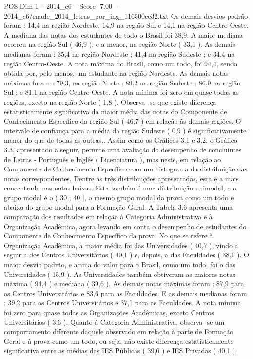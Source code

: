 \begin{textsample}{POS Dim 1 – 2014\_c6 – Score -7.00 – 2014\_c6/enade\_2014\_letras\_por\_ing\_116500ce32.txt}
Os demais desvios padrão foram : 14,4 na região Nordeste, 14,9 na região Sul e 14,1 na região Centro-Oeste.
A mediana das notas dos estudantes de todo o Brasil foi 38,9.
A maior mediana ocorreu na região Sul ( 46,9 ), e a menor, na região Norte ( 33,1 ).
As demais medianas foram : 35,4 na região Nordeste ; 41,4 na região Sudeste ; e 34,4 na região Centro-Oeste.
A nota máxima do Brasil, como um todo, foi 94,4, sendo obtida por, pelo menos, um estudante na região Nordeste.
As demais notas máximas foram : 79,3, na região Norte ; 89,2 na região Sudeste ; 86,9 na região Sul ; e 81,1 na região Centro-Oeste.
A nota mínima foi zero em quase todas as regiões, exceto na região Norte ( 1,8 ).
Observa -se que existe diferença estatisticamente significativa da maior média das notas do Componente de Conhecimento Específico da região Sul ( 46,7 ) em relação às demais regiões.
O intervalo de confiança para a média da região Sudeste ( 0,9 ) é significativamente menor do que de todas as outras..
Assim como os Gráficos 3.1 e 3.2, o Gráfico 3.3, apresentado a seguir, permite uma avaliação do desempenho de concluintes de Letras - Português e Inglês ( Licenciatura ), mas neste, em relação ao Componente de Conhecimento Específico com um histograma da distribuição das notas correspondentes.
Dentre as três distribuições apresentadas, esta é a mais concentrada nas notas baixas.
Esta também é uma distribuição unimodal, e o grupo modal é o ( 30 ; 40 ], o mesmo grupo modal da prova como um todo e abaixo do grupo modal para a Formação Geral.
A Tabela 3.6 apresenta uma comparação dos resultados em relação à Categoria Administrativa e à Organização Acadêmica, agora levando em conta o desempenho de estudantes do Componente de Conhecimento Específico da prova.
No que se refere à Organização Acadêmica, a maior média foi das Universidades ( 40,7 ), vindo a seguir a dos Centros Universitários ( 40,1 ) e, depois, a das Faculdades ( 38,0 ).
O maior desvio padrão, e acima do valor para o Brasil, como um todo, foi o das Universidades ( 15,9 ).
As Universidades também obtiveram as maiores notas máxima ( 94,4 ) e mediana ( 39,6 ).
As demais notas máximas foram : 87,9 para os Centros Universitários e 83,6 para as Faculdades.
E as demais medianas foram : 39,2 para os Centros Universitários e 37,1 para as Faculdades.
A nota mínima foi zero para quase todas as Organizações Acadêmicas, exceto Centros Universitários ( 3,6 ).
Quanto à Categoria Administrativa, observa -se um comportamento diferente daquele observado em relação à parte de Formação Geral e à prova como um todo, ou seja, não existe diferença estatisticamente significativa entre as médias das IES Públicas ( 39,6 ) e IES Privadas ( 40,1 ).

\end{textsample}
